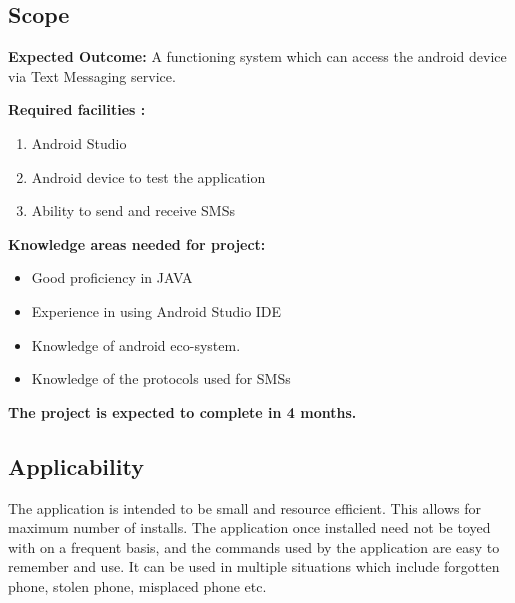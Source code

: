  \subsection{Scope}
 \begin{flushleft}
 	\textbf{Expected Outcome:} A functioning system which can access the android device via Text Messaging service.
 	
 	
 	\textbf{Required facilities :}
 	\begin{enumerate}
 		\item Android Studio
 		
 		\item Android device to test the application
 		
 		\item Ability to send and receive SMSs 
 		
 	\end{enumerate}
 	
 	\textbf{Knowledge areas needed for project:}
 	\begin{itemize}
 		\item Good proficiency in JAVA 
 		\item Experience in using Android Studio IDE 
 		\item Knowledge of android eco-system.
 		\item Knowledge of the protocols used for SMSs
 	\end{itemize}
 	
 	\textbf{The project is expected to complete in 4 months.}
 \end{flushleft}

\subsection{Applicability}
\hspace{0.9cm} The application is intended to be small and resource efficient. This allows for maximum number of installs. The application once installed need not be toyed with on a frequent basis, and the commands used by the application are easy to remember and use. It can be used in multiple situations which include forgotten phone, stolen phone, misplaced phone etc.  
 
 





